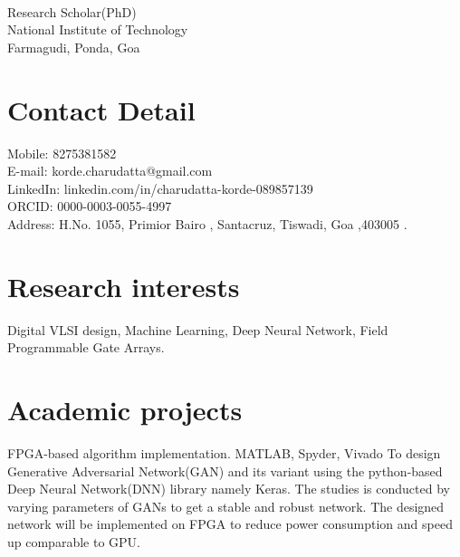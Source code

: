 \documentclass[fontsize=11pt]{tccv}
\begin{document}
\fancypage{\setlength{\fboxsep}{10pt}\fbox}{}
\\
Research Scholar(PhD)\\
National Institute of Technology\\ 
Farmagudi, Ponda, Goa\\ 
\section{Contact Detail}
\begin{flushleft} Mobile: 8275381582\\
E-mail: korde.charudatta@gmail.com\\
LinkedIn: linkedin.com/in/charudatta-korde-089857139\\
ORCID: 0000-0003-0055-4997\\
Address: H.No. 1055, Primior Bairo ,
Santacruz, Tiswadi, Goa ,403005 .
\end{flushleft}

\vspace{1em}
\section{Research interests}
Digital VLSI design, Machine Learning, Deep Neural Network, Field Programmable Gate Arrays.
\vspace{1em}



\section{Academic projects}
\begin{project}
	\item{FPGA-based algorithm implementation.}
	{MATLAB, Spyder, Vivado}
	{To design Generative Adversarial Network(GAN) and its variant using the python-based Deep Neural Network(DNN) library namely Keras. The studies is conducted by varying parameters of GANs to get a stable and robust network. The designed network will be implemented on  FPGA  to reduce power consumption and speed up comparable to GPU.  }\\
\end{project}
\vspace{1em}
\end{document}
